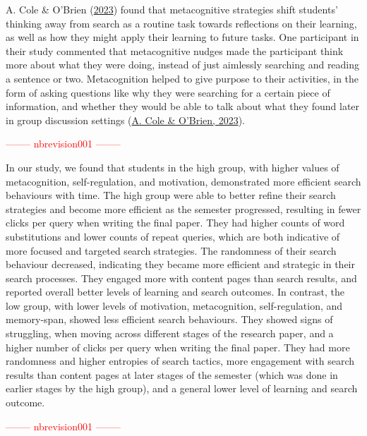 \documentclass[letterpaper, nobind]{templates/ociamthesis}
\begin{document}
A. Cole \& O'Brien (\protect\hyperlink{ref-cole2023using}{2023}) found that metacognitive strategies shift students' thinking away from search as a routine task towards reflections on their learning, as well as how they might apply their learning to future tasks.
One participant in their study commented that metacognitive nudges made the participant think more about what they were doing, instead of just aimlessly searching and reading a sentence or two.
Metacognition helped to give purpose to their activities, in the form of asking questions like why they were searching for a certain piece of information, and whether they would be able to talk about what they found later in group discussion settings (\protect\hyperlink{ref-cole2023using}{A. Cole \& O'Brien, 2023}).

\textcolor{red}{-------- nbrevision001 --------}

In our study, we found that students in the high group, with higher values of metacognition, self-regulation, and motivation, demonstrated more efficient search behaviours with time.
The high group were able to better refine their search strategies and become more efficient as the semester progressed, resulting in fewer clicks per query when writing the final paper.
They had higher counts of word substitutions and lower counts of repeat queries, which are both indicative of more focused and targeted search strategies.
The randomness of their search behaviour decreased, indicating they became more efficient and strategic in their search processes.
They engaged more with content pages than search results, and reported overall better levels of learning and search outcomes.
In contrast, the low group, with lower levels of motivation, metacognition, self-regulation, and memory-span, showed less efficient search behaviours.
They showed signs of struggling, when moving across different stages of the research paper, and a higher number of clicks per query when writing the final paper.
They had more randomness and higher entropies of search tactics, more engagement with search results than content pages at later stages of the semester (which was done in earlier stages by the high group), and a general lower level of learning and search outcome.

\textcolor{red}{-------- nbrevision001 --------}
\end{document}
